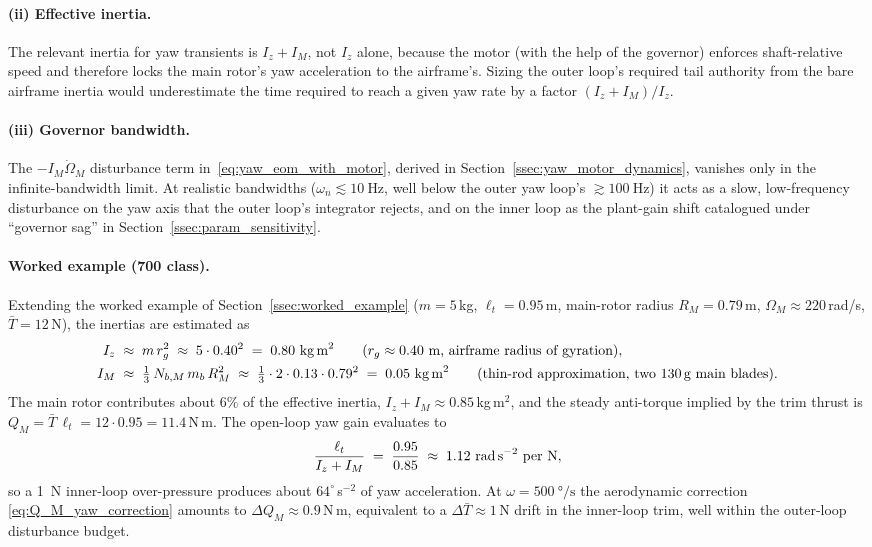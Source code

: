 \documentclass[11pt,a4paper]{article}
\newcommand{\bT}{\bar{T}}
\begin{document}
\paragraph{(ii) Effective inertia.}
The relevant inertia for yaw transients is \(I_z+I_M\), not \(I_z\)
alone, because the motor (with the help of the governor) enforces
shaft-relative speed and therefore locks the main rotor's yaw
acceleration to the airframe's. Sizing the outer loop's required
tail authority from the bare airframe inertia would underestimate
the time required to reach a given yaw rate by a factor
\((I_z+I_M)/I_z\).

\paragraph{(iii) Governor bandwidth.}
The \(-I_M\dot\Omega_M\) disturbance term
in~\eqref{eq:yaw_eom_with_motor}, derived in
Section~\ref{ssec:yaw_motor_dynamics}, vanishes only in the
infinite-bandwidth limit. At realistic bandwidths
(\(\omega_n\lesssim\SI{10}{\hertz}\), well below the outer yaw
loop's \(\gtrsim\SI{100}{\hertz}\)) it acts as a slow,
low-frequency disturbance on the yaw axis that the outer loop's
integrator rejects, and on the inner loop as the plant-gain shift
catalogued under ``governor sag'' in
Section~\ref{ssec:param_sensitivity}.

\paragraph{Worked example (700 class).}
Extending the worked example of
Section~\ref{ssec:worked_example} (\(m=5\)\,kg, \(\ell_t=0.95\)\,m,
main-rotor radius \(R_M=0.79\)\,m, \(\Omega_M\approx 220\)\,rad/s,
\(\bT=12\)\,N), the inertias are estimated as
\begin{align*}
I_z &\;\approx\; m\,r_g^2
       \;\approx\; 5\cdot 0.40^2
       \;=\; 0.80~\text{kg\,m}^2 \qquad
       (r_g\approx 0.40~\text{m, airframe radius of gyration}),\\
I_M &\;\approx\; \tfrac{1}{3}\,N_{b,M}\,m_b\,R_M^2
       \;\approx\; \tfrac{1}{3}\cdot 2\cdot 0.13\cdot 0.79^2
       \;=\; 0.05~\text{kg\,m}^2 \qquad
       (\text{thin-rod approximation, two 130\,g main blades}).
\end{align*}
The main rotor contributes about \(6\%\) of the effective inertia,
\(I_z+I_M\approx 0.85\)\,kg\,m\(^2\), and the steady anti-torque
implied by the trim thrust is
\(Q_M=\bT\,\ell_t=12\cdot 0.95=11.4\)\,N\,m. The open-loop yaw
gain evaluates to
\begin{equation*}
\frac{\ell_t}{I_z+I_M}
   \;=\; \frac{0.95}{0.85}
   \;\approx\; 1.12~\text{rad\,s}^{-2}\text{ per N},
\end{equation*}
so a \SI{1}{\newton} inner-loop over-pressure produces about
\(64^\circ\)\,s\(^{-2}\) of yaw acceleration. At
\(\omega=\SI{500}{\degree\per\second}\) the aerodynamic
correction \eqref{eq:Q_M_yaw_correction} amounts to
\(\Delta Q_M\approx 0.9\)\,N\,m, equivalent to a
\(\Delta\bT\approx 1\)\,N drift in the inner-loop trim, well
within the outer-loop disturbance budget.
\end{document}
